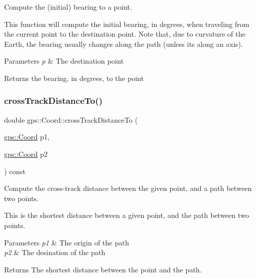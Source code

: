 Compute the (initial) bearing to a point.

This function will compute the initial bearing, in degrees, when traveling from the current point to the destination point. Note that, due to curvature of the Earth, the bearing usually changes along the path (unless its along an axis).


\begin{DoxyParams}{Parameters}
{\em p} & The destination point \\
\hline
\end{DoxyParams}
\begin{DoxyReturn}{Returns}
the bearing, in degrees, to the point 
\end{DoxyReturn}
\mbox{\label{classgps_1_1Coord_a2d421b8235201290c2a7c5d13eba097e}} 
\subsubsection{\texorpdfstring{cross\+Track\+Distance\+To()}{crossTrackDistanceTo()}}
{\footnotesize\ttfamily double gps\+::\+Coord\+::cross\+Track\+Distance\+To (\begin{DoxyParamCaption}\item[{\hyperlink{classgps_1_1Coord}{gps\+::\+Coord}}]{p1,  }\item[{\hyperlink{classgps_1_1Coord}{gps\+::\+Coord}}]{p2 }\end{DoxyParamCaption}) const}

Compute the cross-\/track distance between the given point, and a path between two points.

This is the shortest distance between a given point, and the path between two points.


\begin{DoxyParams}{Parameters}
{\em p1} & The origin of the path \\
\hline
{\em p2} & The desination of the path \\
\hline
\end{DoxyParams}
\begin{DoxyReturn}{Returns}
The shortest distance between the point and the path. 
\end{DoxyReturn}
\mbox{\label{classgps_1_1Coord_a774fc85267d9cd3d01d151e784f1112c}} 
